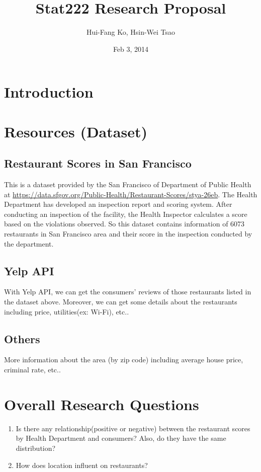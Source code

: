 \documentclass{article}
\title{Stat222 Research Proposal}
\author{Hui-Fang Ko, Hsin-Wei Tsao}
\date{Feb 3, 2014}
\begin{document}
\maketitle

\section{Introduction}




\section{Resources (Dataset)}
\subsection{Restaurant Scores in San Francisco}
This is a dataset provided by the San Francisco of Department of Public Health at \url{https://data.sfgov.org/Public-Health/Restaurant-Scores/stya-26eb}. The Health Department has developed an inspection report and scoring system. After conducting an inspection of the facility, the Health Inspector calculates a score based on the violations observed. So this dataset contains information of 6073 restaurants in San Francisco area and their score in the inspection conducted by the department.

\subsection{Yelp API}
With Yelp API, we can get the consumers' reviews of those restaurants listed in the dataset above. Moreover, we can get some details about the restaurants including price, utilities(ex: Wi-Fi), etc.. 

\subsection{Others}
More information about the area (by zip code) including average house price, criminal rate, etc..

\section{Overall Research Questions}

\begin{enumerate}
  \item Is there any relationship(positive or negative) between the restaurant scores by Health Department and consumers? Also, do they have  the same distribution?
  \item How does location influent on restaurants?
\end{enumerate}
\end{document}
